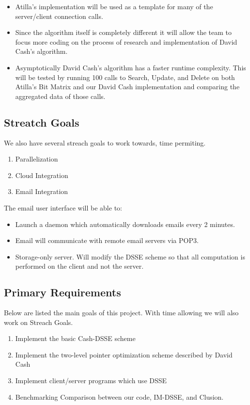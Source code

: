 \documentclass[onecolumn, draftclsnofoot,10pt, compsoc]{IEEEtran}
\begin{document}
\begin{itemize}
\item Atilla's implementation will be used as a template for many of the server/client connection calls. 

\item Since the algorithm itself is completely different it will allow the team to focus more coding on the process of research and implementation of David Cash's algorithm.

\item Asymptotically David Cash's algorithm has a faster runtime complexity. This will be tested by running 100 calls to Search, Update, and Delete on both Atilla's Bit Matrix and our David Cash implementation and comparing the aggregated data of those calls.
\end{itemize}

\subsection{ Streatch Goals }
We also have several streach goals to work towards, time permiting.

\begin{enumerate}
\item Parallelization
\item Cloud Integration
\item Email Integration
\end{enumerate}


The email user interface will be able to:
\begin{itemize}	
\item Launch a daemon which automatically downloads emails every 2 minutes.
\item Email will communicate with remote email servers via POP3.
\end{itemize}
\begin{itemize}
\item Storage-only server. Will modify the DSSE scheme so that all computation is performed on the client and not the server.
\end{itemize}


\subsection{ Primary Requirements}
Below are listed the main goals of this project. With time allowing we will also work on Streach Goals.

\begin{enumerate}
\item Implement the basic Cash-DSSE scheme
\item Implement the two-level pointer optimization scheme described by David Cash
\item Implement client/server programs which use DSSE
\item Benchmarking Comparison between our code, IM-DSSE\cite{im-dsse}, and Clusion\cite{clusion}.
\end{enumerate}
\end{document}

